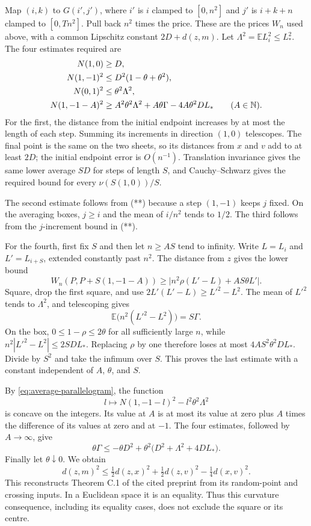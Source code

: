 Map $(i,k)$ to $G(i',j')$, where $i'$ is $i$ clamped to
$[0,n^2]$ and $j'$ is $i+k+n$ clamped to $[0,Tn^2]$.
Pull back $n^2$ times the price. These are the prices $W_n$
used above, with a common Lipschitz constant $2D+d(z,m)$.
Let $\Lambda^2=\mathbb E L_i^2\leq L_*^2$.
The four estimates required are
\begin{align*}
 N(1,0)&\geq D,\\
 N(1,-1)^2&\leq D^2(1-\theta+\theta^2),\\
 N(0,1)^2&\leq\theta^2\Lambda^2,\\
 N(1,-1-A)^2&\geq
 A^2\theta^2\Lambda^2+A\theta\Gamma
                  -4A\theta^2DL_* \qquad(A\in\mathbb N).
\end{align*}
For the first, the distance from the initial endpoint increases
by at most the length of each step.
Summing its increments in direction $(1,0)$ telescopes.
The final point is the same on the two sheets, so its distances
from $x$ and $v$ add to at least $2D$; the initial endpoint error
is $O(n^{-1})$. Translation invariance gives the same lower
average $SD$ for steps of length $S$, and Cauchy--Schwarz gives
the required bound for every $\nu(S(1,0))/S$.

The second estimate follows from (**) because a step $(1,-1)$
keeps $j$ fixed. On the averaging boxes, $j\geq i$ and
the mean of $i/n^2$ tends to $1/2$.
The third follows from the $j$-increment bound in (**).

For the fourth, first fix $S$ and then let $n\geq AS$ tend to
infinity. Write $L=L_i$ and $L'=L_{i+S}$, extended constantly
past $n^2$. The distance from $z$ gives the lower bound
\[
 W_n(P,P+S(1,-1-A))
 \geq\bigl|n^2\rho(L'-L)+AS\theta L'\bigr|.
\]
Square, drop the first square, and use
$2L'(L'-L)\geq L'^2-L^2$.
The mean of $L'^2$ tends to $\Lambda^2$, and telescoping gives
\[
 \mathbb E\bigl(n^2(L'^2-L^2)\bigr)=S\Gamma.
\]
On the box, $0\leq1-\rho\leq2\theta$ for all sufficiently
large $n$, while
$n^2|L'^2-L^2|\leq2SDL_*$.
Replacing $\rho$ by one therefore loses at most
$4AS^2\theta^2DL_*$.
Divide by $S^2$ and take the infimum over $S$.
This proves the last estimate with a constant independent of
$A$, $\theta$, and $S$.

By \eqref{eq:average-parallelogram}, the function
\[
 l\longmapsto N(1,-1-l)^2-l^2\theta^2\Lambda^2
\]
is concave on the integers. Its value at $A$ is at most its
value at zero plus $A$ times the difference of its values at
zero and at $-1$.
The four estimates, followed by $A\to\infty$, give
\[
 \theta\Gamma\leq-\theta D^2+
       \theta^2\bigl(D^2+\Lambda^2+4DL_*\bigr).
\]
Finally let $\theta\downarrow0$. We obtain
\begin{equation}
 d(z,m)^2\leq
 \tfrac12d(z,x)^2+\tfrac12d(z,v)^2-\tfrac14d(x,v)^2 .
 \label{eq:checked-cn}
\end{equation}
This reconstructs Theorem C.1 of the cited preprint from its
random-point and crossing inputs. In a Euclidean space it is
an equality. Thus this curvature consequence, including its
equality cases, does not exclude the square or its centre.
